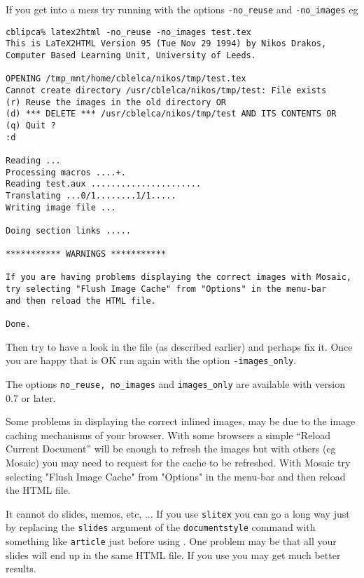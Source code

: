 \begin{htmllist}
If you get into a mess try running \latextohtml{} with the options
\texttt{-no\_reuse} and \texttt{-no\_images} eg
\begin{verbatim}
cblipca% latex2html -no_reuse -no_images test.tex
This is LaTeX2HTML Version 95 (Tue Nov 29 1994) by Nikos Drakos, 
Computer Based Learning Unit, University of Leeds.

OPENING /tmp_mnt/home/cblelca/nikos/tmp/test.tex 
Cannot create directory /usr/cblelca/nikos/tmp/test: File exists
(r) Reuse the images in the old directory OR
(d) *** DELETE *** /usr/cblelca/nikos/tmp/test AND ITS CONTENTS OR
(q) Quit ?
:d

Reading ...
Processing macros ....+.
Reading test.aux ......................
Translating ...0/1........1/1.....
Writing image file ...

Doing section links .....

*********** WARNINGS ***********

If you are having problems displaying the correct images with Mosaic,
try selecting "Flush Image Cache" from "Options" in the menu-bar 
and then reload the HTML file.

Done.
\end{verbatim}

Then try to have a look 
in the file   (as described earlier) and perhaps fix it.
Once you are happy that  is OK run \latextohtml{}
again with the option \texttt{-images\_only}.

The options \texttt{no\_reuse, no\_images} and \texttt{images\_only}
are available with \latextohtml{} version 0.7 or later.

Some problems in displaying the correct inlined images,
may be due to the image caching mechanisms of your browser.
With some browsers a simple ``Reload Current Document'' will be enough
to refresh the images but with others (eg Mosaic) you may need
to request for the cache to be refreshed. With Mosaic try 
selecting "Flush Image Cache" from "Options" in the menu-bar 
and then reload the HTML file.


\item [It cannot do slides, memos, etc, ...] 
If you use \texttt{slitex} you can go a long way just by replacing 
the \texttt{slides} argument of the \texttt{documentstyle} command with 
something like \texttt{article} just before using \latextohtml.
One problem may be that all your slides will end up in the  same HTML 
file.
If you use  you may get much better results.
\end{htmllist}

